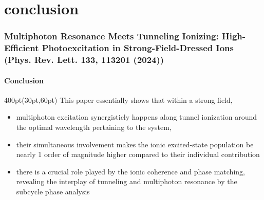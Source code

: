
\section{conclusion}

\begin{frame}
\frametitle{
Multiphoton Resonance Meets Tunneling Ionizing:
High-Efficient Photoexcitation in Strong-Field-Dressed Ions\\
\small (Phys. Rev. Lett. \textbf{133}, 113201 (2024))
}

\framesubtitle{Conclusion}


\small
\begin{textblock*}{400pt}(30pt,60pt)
\vspace{30pt}
This paper essentially shows that within a strong field, 
\begin{itemize}
\footnotesize
\item multiphoton excitation synergisticly happens 
along tunnel ionization around 
the optimal wavelength pertaining to the system,
\item their simultaneous involvement makes the ionic excited-state 
population be nearly 1 order of magnitude higher compared to their individual 
contribution
\item there is a crucial role played by the ionic coherence 
and phase matching, revealing the interplay of tunneling 
and multiphoton resonance by the subcycle phase analysis

\vspace{20pt}

\end{itemize}

\end{textblock*}



\end{frame}
